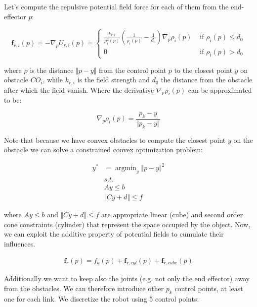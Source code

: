 \documentclass[11pt]{article}
\DeclareMathOperator*{\argmin}{argmin}
\begin{document}
Let's compute the repulsive potential field force for each of them from the end-effector $p$:

\begin{equation}
\mathbf{f}_{r, i}(p)=-\nabla_{p} U_{r, i}(p)=\left\{\begin{array}{ll}
\frac{k_{r, i}}{\rho_{i}^{2}(p)}\left(\frac{1}{\rho_{i}(p)}-\frac{1}{d_{0}}\right) \nabla_{p} \rho_{i}(p) & \text { if } \rho_{i}(p) \leq d_{0} \\
0 & \text { if } \rho_{i}(p)>d_{0}
\end{array}\right.
\end{equation}
 
where $\rho$ is the distance $\Vert p - y\Vert$ from the control point $p$ to the closest point $y$ on obstacle $CO_i$, while  $k_{r, i}$ is the field strength and $d_0$ the distance from the obstacle after which the field vanish. Where the derivative $ \nabla_{p} \rho_{i}(p) $ can be approximated to be:

\begin{equation}
 \nabla_{p} \rho_{i}(p) = \frac{ p_k - y}{\Vert p_k -y \Vert}
\end{equation}


 Note that because we have convex obstacles to compute the closest point $y$ on the obstacle we can solve a constrained convex optimization problem:

\begin{align}
y^* &= \argmin_y \Vert p - y \Vert ^2\\
&s.t.  \nonumber  \\
   &Ay \leq b   \nonumber \\ 
   &\Vert Cy + d \Vert \leq f \nonumber 
\end{align}

where $   Ay \leq b$ and $ \Vert Cy + d \Vert \leq f$ are appropriate linear (cube) and second order cone constraints (cylinder)
that  represent the space occupied by the object.
Now, we can exploit the additive property of potential fields to cumulate their influences. 

\begin{align}
\mathbf{f}_{r}(p) = f_a(p) + \mathbf{f}_{r, {cyl}}(p) + \mathbf{f}_{r, {cube}}(p)
\end{align}




Additionally we want to keep also the joints (e.g. not only the end effector) 
away from the obstacles. We can therefore introduce other $p_k$  control 
points, at least one  for each link. 
We discretize the robot using 5 control points: 
\end{document}
